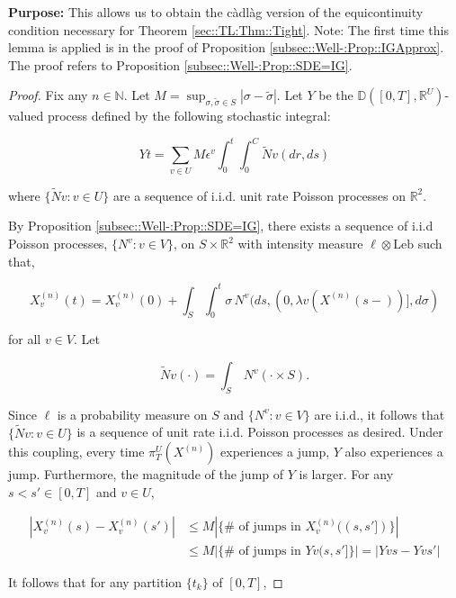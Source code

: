 \documentclass[12pt]{article}
\newcommand{\mb}{\mathbb}
\newcommand{\te}{\text}
\newcommand{\ep}{\epsilon}
\newcommand{\purpose}{\textbf{Purpose: }}
\newcommand{\ind}{\hspace{24pt}}
\newcommand{\cad}{\mb{D}}							%
\renewcommand{\v}{v}							%
\renewcommand{\U}{U}							%
\renewcommand{\S}{S}							%
\newcommand{\s}{\sigma}							%
\newcommand{\ev}{\ep}							%
\newcommand{\T}{T}								%
\renewcommand{\t}{t}							%
\newcommand{\proj}{\pi}							%
\renewcommand{\tt}{s}							%
\newcommand{\ttt}{s'}							%
\newcommand{\X}{X}								%
\newcommand{\vind}[1]{^{#1}}					%
\newcommand{\vsi}[1]{^{#1}}						%
\newcommand{\cind}[1]{_{#1}}					%
\newcommand{\tp}[1]{(#1)}						%
\newcommand{\tip}[1]{#1}						%
\newcommand{\ts}[1]{_{#1}}						%
\newcommand{\const}{C}							%
\newcommand{\sln}[1]{^{(#1)}}					%
\renewcommand{\ss}{\tilde{\s}}					%
\newcommand{\poiss}{N}							%
\newcommand{\leb}{\te{Leb}}						%
\newcommand{\Sm}{\ell}							%
\newcommand{\rate}{\lambda}						%
\renewcommand{\r}{r}							%
\newcommand{\cconst}{M}							%
\newcommand{\alt}[1]{\widetilde{#1}}			%
\newcommand{\indx}[1]{_{#1}}					%
\newcommand{\XX}{Y}								%
\renewcommand{\it}{k}							%
\begin{document}
\purpose This allows us to obtain the c\`adl\`ag version of the equicontinuity condition necessary for Theorem \ref{sec::TL:Thm::Tight}. Note: The first time this lemma is applied is in the proof of Proposition \ref{subsec::Well-:Prop::IGApprox}. The proof refers to Proposition \ref{subsec::Well-:Prop::SDE=IG}.

\begin{proof}
Fix any \(n \in \mb{N}\). Let \(\cconst = \sup_{\s,\ss \in \S} |\s - \ss|\). Let \(\XX{}{}\) be the \(\cad([0,\T],\mb{R}^\U)\)-valued process defined by the following stochastic integral:

\[\XX{}{\t} = \sum_{\v \in \U}\cconst\ev\vind{\v}\int_0^\t\int_0^{\const\indx{}}\alt{\poiss}{\v}(d\r, d\tt)\]

where \(\{\alt{\poiss}{\v}:\v \in \U\}\) are a sequence of i.i.d. unit rate Poisson processes on \(\mb{R}^2\). 

\ind By Proposition \ref{subsec::Well-:Prop::SDE=IG}, there exists a sequence of i.i.d Poisson processes, \(\{\poiss\vind{\v}:\v\in V\}\), on \(\S\times\mb{R}^2\) with intensity measure \(\Sm\otimes \leb\) such that,

\[\X\sln{n}\cind{\v}\tp{\t} = \X\sln{n}\cind{\v}\tp{0} + \int_\S\int_0^\t \s\,\poiss\vind{\v}(d\tt,(0,\rate{\v}(\X\sln{n}\cind{}\tp{\tt-})],d\s)\]

for all \(\v\in V\). Let

\[\alt{\poiss}{\v}(\cdot) = \int_\S\,\poiss\vind{\v}(\cdot\times \S).\]

Since \(\Sm\) is a probability measure on \(\S\) and \(\{\poiss\vind{\v}:\v\in V\}\) are i.i.d., it follows that \(\{\alt{\poiss}{\v}:\v\in \U\}\) is a sequence of unit rate i.i.d. Poisson processes as desired. Under this coupling, every time \(\proj\vsi{\U}\ts{\T}(\X\sln{n}\cind{}\tip{})\) experiences a jump, \(\XX{}{}\) also experiences a jump. Furthermore, the magnitude of the jump of \(\XX{}{}\) is larger. For any \(\tt<\ttt\in [0,\T]\) and \(\v\in \U\),

\begin{align*}
|\X\sln{n}\cind{\v}\tp{\tt} - \X\sln{n}\cind{\v}\tp{\ttt}|&\leq \cconst\left|\{\#\te{ of jumps in }\X\sln{n}\cind{\v}\tp{(\tt,\ttt]}\}\right| \\
&\leq \cconst\left|\{\#\te{ of jumps in }\XX{\v}{(\tt,\ttt]}\}\right| = \left|\XX{\v}{\tt} - \XX{\v}{\ttt}\right|
\end{align*}

It follows that for any partition \(\{\t\indx{\it}\}\) of \([0,\T]\),


\end{proof}
\end{document}

